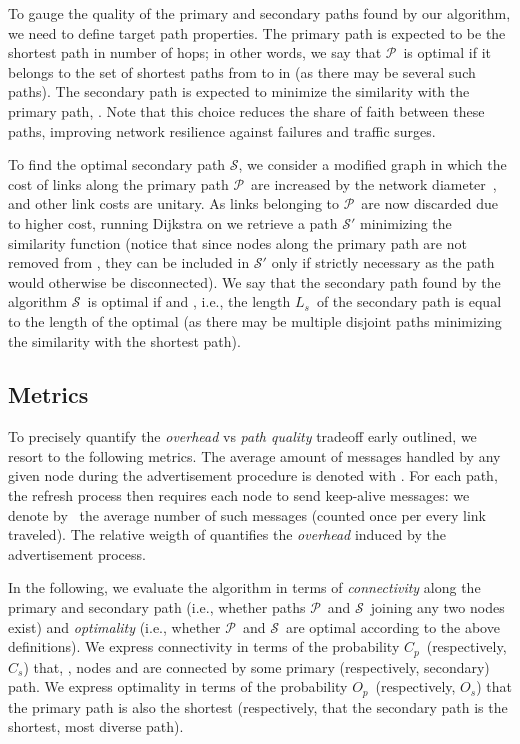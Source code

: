 \documentclass[conference]{IEEEtran}
\newcommand{\PA}{\ensuremath{\mathcal{P}}}
\newcommand{\SE}{\ensuremath{\mathcal{S}}}
\newcommand{\path}[1]{\ensuremath{\mathcal{#1}}} \newcommand{\lenP}{\ensuremath{L_p}} \newcommand{\lenS}{\ensuremath{L_s}} \newcommand{\degr}{\ensuremath{\bar{\delta}}} \newcommand{\diamp}{\ensuremath{D_p}} \newcommand{\diams}{\ensuremath{D_s}}
\newcommand{\np}{\nrefresh}
\newcommand{\pc}{\ensuremath{C_p}}   \newcommand{\seco}{\ensuremath{C_s}} \newcommand{\po}{\ensuremath{O_p}}   \newcommand{\so}{\ensuremath{O_s}}
\begin{document}
To gauge the quality of the primary and secondary paths found by our algorithm, 
we need to define target path properties. The primary path is expected to be  the shortest path in number of hops; in other words, we say that  \PA\ is optimal if it belongs to the set of shortest paths from  to   in  (as there may be several such paths). The secondary path is expected to  minimize the similarity with the primary path, . Note that this choice reduces the share of faith between these paths, improving network resilience against failures and traffic surges.

To find the optimal secondary path \SE, we consider a modified graph  in which the cost of links along the primary path \PA\ are increased by the network diameter~\cite{Ogier93IEETrans}, and other link costs are unitary. As links belonging to \PA\ are now discarded due to higher cost, running Dijkstra on  we retrieve a path \path{S'} minimizing the similarity function  (notice that since nodes along the primary path are not removed from , they can be included in \path{S'} only if strictly necessary as the path would otherwise be disconnected). We say that the secondary path found by the algorithm \SE\ is  optimal if  and , i.e., the length \lenS\ of the secondary path is equal to the length  of the optimal   (as there may be multiple disjoint paths minimizing the similarity with the shortest path).


\subsection{Metrics}

To precisely quantify the  \emph{overhead} vs \emph{path quality} tradeoff early outlined, we resort to the following metrics.
The average amount of messages handled by any given node during the advertisement procedure is denoted with \nm. For each path, the refresh process then requires each node to send keep-alive messages: we denote by  \np\ the average number of such messages (counted once per every link traveled). The relative weigth of  quantifies the \emph{overhead} induced by the advertisement process.

In the following, we evaluate the algorithm in terms of \emph{connectivity} along the primary and secondary path (i.e., whether paths  \PA\ and \SE\ joining any two nodes  exist) and \emph{optimality} (i.e., whether  \PA\ and \SE\ are optimal according to the above definitions).
We  express connectivity in terms of the probability \pc\ (respectively, \seco) that, , nodes  and  are connected by some primary (respectively, secondary) path.   
We express  optimality in terms of the probability \po\ (respectively, \so) that the primary path is also the shortest (respectively, that the secondary path is the shortest, most diverse path).
\end{document}
